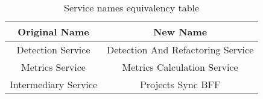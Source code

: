\begin{table}[!ht]
    \centering
    \caption{Service names equivalency table}
\begin{tabular}{c c}
        \toprule
        \textbf{Original Name} & \textbf{New Name} \\
        \midrule
        Detection Service & Detection And Refactoring Service \\
        Metrics Service & Metrics Calculation Service \\
        Intermediary Service & Projects Sync BFF \\
        \bottomrule
    \end{tabular}
    \label{tab-services-map}
\end{table}